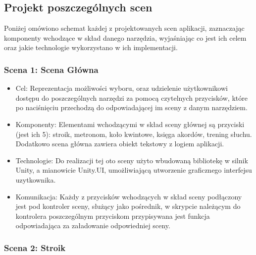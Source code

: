 \subsection{Projekt poszczególnych scen}
Poniżej omówiono schemat każdej z projektowanych scen aplikacji, zaznaczając komponenty wchodzące w skład danego narzędzia, wyjaśniając co jest ich celem oraz jakie technologie wykorzystano w ich implementacji. 

\subsubsection{Scena 1: Scena Główna}

\begin{itemize}

\item Cel: Reprezentacja możliwości wyboru, oraz udzielenie użytkownikowi dostępu do poszczególnych narzędzi za pomocą czytelnych przycisków, które po naciśnięciu przechodzą do odpowiadającej im sceny z danym narzędziem. 
\item Komponenty: Elementami wchodzącymi w skład sceny głównej są przyciski (jest ich 5): stroik, metronom, koło kwintowe, księga akordów, trening słuchu. Dodatkowo scena główna zawiera obiekt tekstowy z logiem aplikacji.  
\item Technologie: Do realizacji tej oto sceny użyto wbudowaną bibliotekę w silnik Unity, a mianowicie Unity.UI, umożliwiającą utworzenie graficznego interfejsu uzytkownika. 
\item Komunikacja: Każdy z przycisków wchodzących w skład sceny podłączony jest pod kontroler sceny, służący jako pośrednik, w skrypcie należącym do kontrolera poszczególnym przyciskom przypisywana jest funkcja odpowiadająca za załadowanie odpowiedniej sceny. 
\end{itemize}

\subsubsection{Scena 2: Stroik}

